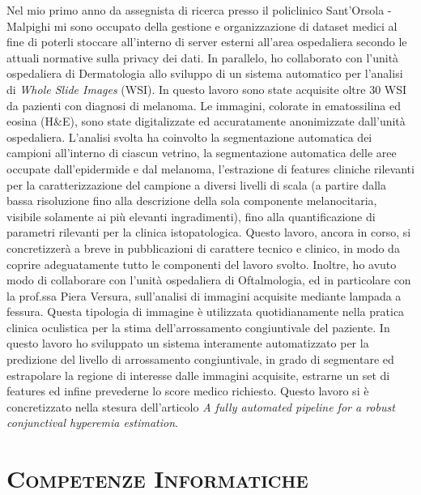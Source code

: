 \documentclass[a4paper,11pt]{article}
\begin{document}
Nel mio primo anno da assegnista di ricerca presso il policlinico Sant'Orsola - Malpighi mi sono occupato della gestione e organizzazione di dataset medici al fine di poterli stoccare all'interno di server esterni all'area ospedaliera secondo le attuali normative sulla privacy dei dati.
In parallelo, ho collaborato con l'unità ospedaliera di Dermatologia allo sviluppo di un sistema automatico per l'analisi di \emph{Whole Slide Images} (WSI).
In questo lavoro sono state acquisite oltre 30 WSI da pazienti con diagnosi di melanoma.
Le immagini, colorate in ematossilina ed eosina (H\&E), sono state digitalizzate ed accuratamente anonimizzate dall'unità ospedaliera.
L'analisi svolta ha coinvolto la segmentazione automatica dei campioni all'interno di ciascun vetrino, la segmentazione automatica delle aree occupate dall'epidermide e dal melanoma, l'estrazione di features cliniche rilevanti per la caratterizzazione del campione a diversi livelli di scala (a partire dalla bassa risoluzione fino alla descrizione della sola componente melanocitaria, visibile solamente ai più elevanti ingradimenti), fino alla quantificazione di parametri rilevanti per la clinica istopatologica.
Questo lavoro, ancora in corso,%
si concretizzerà a breve in pubblicazioni di carattere tecnico e clinico, in modo da coprire adeguatamente tutto le componenti del lavoro svolto.
Inoltre, ho avuto modo di collaborare con l'unità ospedaliera di Oftalmologia, ed in particolare con la prof.ssa Piera Versura, sull'analisi di immagini acquisite mediante lampada a fessura.
Questa tipologia di immagine è utilizzata quotidianamente nella pratica clinica oculistica per la stima dell'arrossamento congiuntivale del paziente.
In questo lavoro ho sviluppato un sistema interamente automatizzato per la predizione del livello di arrossamento congiuntivale, in grado di segmentare ed estrapolare la regione di interesse dalle immagini acquisite, estrarne un set di features ed infine prevederne lo score medico richiesto.
Questo lavoro si è concretizzato nella stesura dell'articolo \emph{A fully automated pipeline for a robust conjunctival hyperemia estimation}.


\vspace*{0.5cm}
\section*{\scshape{Competenze Informatiche}}
\end{document}
